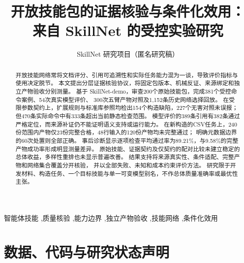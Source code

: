 \documentclass[a4paper,fleqn]{cas-dc}
\begin{document}
\let\WriteBookmarks\relax
\def\floatpagepagefraction{1}
\def\textpagefraction{.01}
\title[mode=title]{开放技能包的证据核验与条件化效用：\texorpdfstring{\\}{ }来自 SkillNet 的受控实验研究}
\author{SkillNet 研究项目（匿名研究稿）}
\begin{abstract}
开放技能网络常将文档评分、引用可追溯性和实际任务能力混为一谈，导致评价指标与使用决定脱节。
本文提出分层证据核验协议，将固定包版本、机械反证、来源绑定和独立产物验收分别测量。
基于 SkillNet-demo，审查200个原始技能包，完成381个受控命令案例、54次真实模型评价、
300次五臂产物对照及1,152条历史网络选择回放。
在受限参数契约上，扩展规则与标准库参照均检出154个构造缺陷，227个无害对照未误报；
但470条实际命令中有333条超出当前静态检查范围。
模型评价的389条引用有382条通过严格定位，而来源补证仍不能证明语义支持或运行能力。
在新构造的CSV任务上，240份范围内产物仅23份完整合格，48行输入的120份产物均未完整通过；
明确元数据边界的60次处置则全部正确。
事后诊断显示逐项检查平均通过率为89.21\%，与9.58\%的完整产物成功率形成明显测量差异。
原始技能、证据契约及仅契约的配对比较未建立稳定的总体收益，多样性重排也未显示普遍改善。
结果支持将来源真实性、条件适配、完整产物和网络集合覆盖分开核验，
并以全部失败、未知和成本约束评价方法。
研究限于开发材料、构造任务、一个目标技能与单一可变模型别名，不作总体质量准确率或最优性主张。
\end{abstract}
\begin{keywords}
智能体技能 \sep 质量核验 \sep 能力边界 \sep 独立产物验收 \sep 技能网络 \sep 条件化效用
\end{keywords}
\maketitle
{}







\section*{数据、代码与研究状态声明}



\clearpage
\appendix

\end{document}
